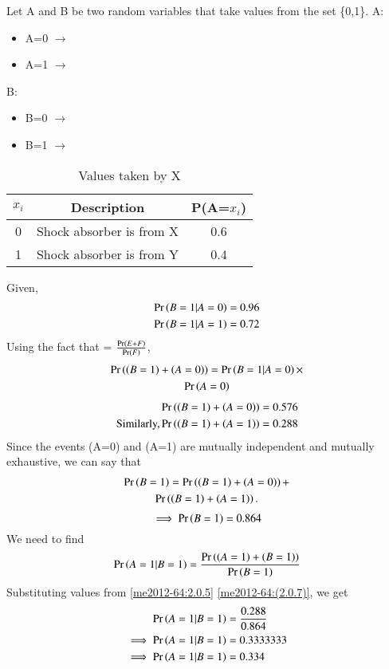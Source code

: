 
Let A and B be two random variables that take values from the set \{0,1\}.\newline
A:
\begin{itemize}
    \item A=0 $\rightarrow$ 
    \item A=1 $\rightarrow$ 
\end{itemize}
B:
\begin{itemize}
    \item B=0 $\rightarrow$ 
    \item B=1 $\rightarrow$ 
\end{itemize}
\begin{table}[h!]
    \centering
    \begin{tabular}{|c|c|c|}
        \hline
        $x_i$ & Description & P(A=$x_i$)\\
        \hline
        0 & Shock absorber is from X & 0.6\\
        1 & Shock absorber is from Y & 0.4\\
        \hline
    \end{tabular}
    \caption{Values taken by X}
    \label{me2012-64:tab:1}
\end{table}
Given,
\begin{align}
    \Pr\left(B=1|A=0\right) &= 0.96\\
    \Pr\left(B=1|A=1\right) &= 0.72
\end{align}
Using the fact that  = $\frac{\Pr\left(E+F\right)}{\Pr\left(F\right)}$,
\begin{multline}
    \Pr\left(\left(B=1\right)+\left(A=0\right)\right) = \Pr\left(B=1|A=0\right) \times \\
    \Pr\left(A=0\right)
\end{multline}
\begin{align}
\pr{\brak{B=1}+\brak{A=0}} &= 0.576 \\
\text{Similarly,}\label{me2012-64:2.0.5} \pr{\brak{B=1}+\brak{A=1}} &= 0.288 
\end{align}
Since the events (A=0) and (A=1) are mutually independent and mutually exhaustive, we can say that 
\begin{multline}
    \Pr\left(B=1\right) = \Pr\left(\left(B=1\right)+\left(A=0\right)\right) + \\
    \Pr\left(\left(B=1\right)+\left(A=1\right)\right).
\end{multline}
\begin{equation}\label{me2012-64:(2.0.7)}
    \implies \pr{B=1} = 0.864
\end{equation}
We need to find 
\begin{align}
    \Pr\left(A=1|B=1\right) = \frac{\Pr\left(\left(A=1\right)+\left(B=1\right)\right)}{\Pr\left(B=1\right)}
\end{align}
Substituting values from \eqref{me2012-64:2.0.5} \eqref{me2012-64:(2.0.7)}, we get
\begin{align}
    \Pr\left(A=1|B=1\right) &= \frac{0.288}{0.864} \\
    \implies \Pr\left(A=1|B=1\right) &= 0.3333333 \\
    \implies \Pr\left(A=1|B=1\right) &= 0.334
\end{align}